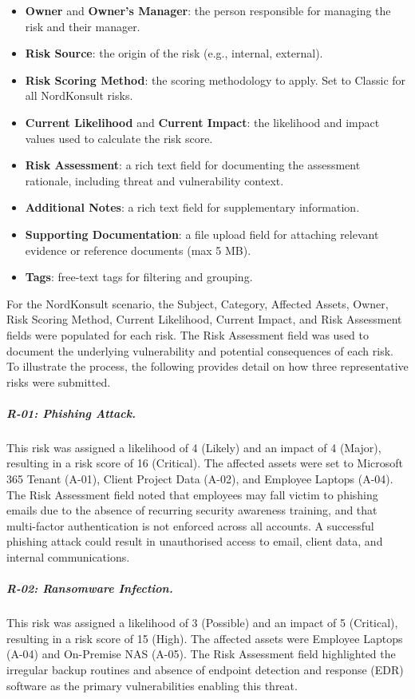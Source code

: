 \begin{itemize}
          with an interest in the risk.
    \item \textbf{Owner} and \textbf{Owner's Manager}: the person responsible for
          managing the risk and their manager.
    \item \textbf{Risk Source}: the origin of the risk (e.g., internal, external).
    \item \textbf{Risk Scoring Method}: the scoring methodology to apply. Set to
          Classic for all NordKonsult risks.
    \item \textbf{Current Likelihood} and \textbf{Current Impact}: the likelihood and
          impact values used to calculate the risk score.
    \item \textbf{Risk Assessment}: a rich text field for documenting the assessment
          rationale, including threat and vulnerability context.
    \item \textbf{Additional Notes}: a rich text field for supplementary information.
    \item \textbf{Supporting Documentation}: a file upload field for attaching
          relevant evidence or reference documents (max 5 MB).
    \item \textbf{Tags}: free-text tags for filtering and grouping.
\end{itemize}
 
For the NordKonsult scenario, the Subject, Category, Affected Assets, Owner, Risk
Scoring Method, Current Likelihood, Current Impact, and Risk Assessment fields were
populated for each risk. The Risk Assessment field was used to document the underlying
vulnerability and potential consequences of each risk. To illustrate the process, the
following provides detail on how three representative risks were submitted.
 
\subparagraph{R-01: Phishing Attack.}
This risk was assigned a likelihood of 4 (Likely) and an impact of 4 (Major), resulting
in a risk score of 16 (Critical). The affected assets were set to Microsoft 365 Tenant
(A-01), Client Project Data (A-02), and Employee Laptops (A-04). The Risk Assessment
field noted that employees may fall victim to phishing emails due to the absence of
recurring security awareness training, and that multi-factor authentication is not
enforced across all accounts. A successful phishing attack could result in unauthorised
access to email, client data, and internal communications.
 
\subparagraph{R-02: Ransomware Infection.}
This risk was assigned a likelihood of 3 (Possible) and an impact of 5 (Critical),
resulting in a risk score of 15 (High). The affected assets were Employee Laptops (A-04)
and On-Premise NAS (A-05). The Risk Assessment field highlighted the irregular backup
routines and absence of endpoint detection and response (EDR) software as the primary
vulnerabilities enabling this threat.
 
